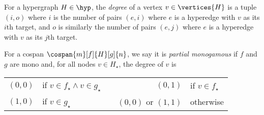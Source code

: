 \begin{definition}
    For a hypergraph \(H \in \hyp\), the \emph{degree} of a vertex
    \(v \in \vertices{H}\) is a tuple \((i,o)\) where \(i\) is the number of
    pairs \((e,i)\) where \(e\) is a hyperedge with \(v\) as its \(i\)th target,
    and \(o\) is similarly the number of pairs \((e,j)\) where \(e\) is a
    hyperedge with \(v\) as its \(j\)th target.
\end{definition}

\begin{definition}
    For a cospan \(\cospan{m}[f]{H}[g]{n}\), we say it is
    \emph{partial monogamous} if \(f\) and \(g\) are mono and, for all nodes
    \(v \in H_\star\), the degree of \(v\) is

    \begin{center}
        \begin{tabular}{rlcrl}
            \((0,0)\)
            &
            if \(v \in f_\star \wedge v \in g_\star\)
            &
            \quad
            &
            \((0,1)\)
            &
            if \(v \in f_\star\)
            \\
            \((1,0)\)
            &
            if \(v \in g_\star\)
            &
            \quad
            &
            \((0,0)\)
            or \((1,1)\)
            &
            otherwise
        \end{tabular}
    \end{center}
\end{definition}

